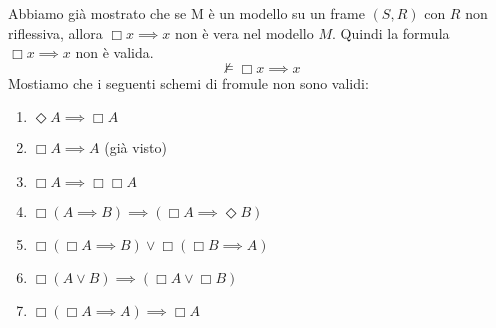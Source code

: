 \documentclass[../main.tex]{subfiles}
\begin{document}
Abbiamo già mostrato che se M è un modello su un frame $(S,R)$ con $R$ non riflessiva, allora $\Box x \implies x$ non è vera nel modello $M$. Quindi la formula $\Box x \implies x$ non è valida.
\begin{equation*}
    \nvDash \Box x \implies x
\end{equation*}
Mostiamo che i seguenti schemi di fromule non sono validi:
\begin{enumerate}
    \item $\Diamond A \implies \Box A$
    \item $\Box A \implies A$ (già visto)
    \item $\Box A \implies \Box \Box A$
    \item $\Box (A \implies B) \implies (\Box A \implies \Diamond B)$
    \item $\Box (\Box A \implies B) \lor \Box (\Box B \implies A)$
    \item $\Box (A \lor B) \implies (\Box A \lor \Box B)$
    \item $\Box(\Box A \implies A) \implies \Box A$
\end{enumerate}
\end{document}
